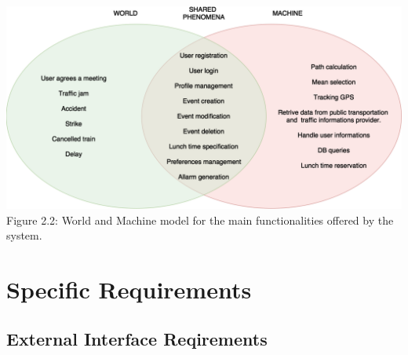 \documentclass{article}
\begin{document}
	\bigskip
	\bigskip
	\begin{center}
		\includegraphics[width=\textwidth]{img/diagrams/world_machine.png} \\ \bigskip
		Figure 2.2: World and Machine model for the main functionalities offered by the system.
	\end{center}
	
	\section{Specific Requirements}
	
	
	\subsection{External Interface Reqirements}
	
	
\end{document}
